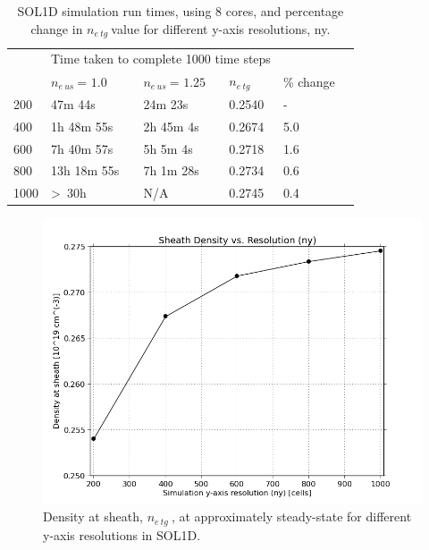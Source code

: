 \documentclass[12pt]{article}  %
\providecommand{\neus}{$n_{e~us}~$} %
\providecommand{\netg}{$n_{e~tg}~$} %
\begin{document}
\begin{table}[]
	\caption{SOL1D simulation run times, using 8 cores, and percentage change in \netg value for different y-axis resolutions, ny.}
	\label{tabsol1dres}
	\begin{tabular}{l|l|l|l|l|l}
		\multicolumn{1}{l|}{\multirow{2}{*}{}} & \multicolumn{3}{l}{Time taken to complete 1000 time steps}    \\ \cline{2-3} 
		\multicolumn{1}{l|}{Resolution}        & \multicolumn{1}{l|}{\neus = $1.0$} & \multicolumn{1}{l|}{\neus = $1.25$}  & \netg & \% change  \\ \hline
		200                 &      47m 44s          &    24m 23s         &  0.2540 &  -    \\
		400                 &      1h 48m 55s       &    2h 45m 4s       &  0.2674 & 5.0   \\
		600                 &      7h 40m 57s       &    5h 5m 4s        &  0.2718 & 1.6   \\
		800                 &      13h 18m 55s      &    7h 1m 28s       &  0.2734 & 0.6  \\
		1000                &   \textgreater~30h    &       N/A          &  0.2745 & 0.4
	\end{tabular}
\end{table}

\begin{figure}
	\includegraphics[scale=0.48]{Figures/sol1d/RE_neres1000.png}
	\centering
	\caption{Density at sheath, \netg, at approximately steady-state for different y-axis resolutions in SOL1D.}\label{figRE_neres1000}
\end{figure}
\end{document}
